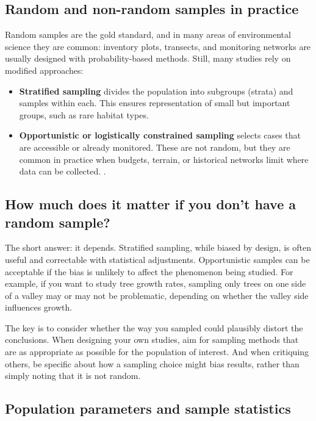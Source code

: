 \documentclass[
  letterpaper,
  DIV=11,
  numbers=noendperiod]{scrreprt}
\providecommand{\tightlist}{%
  \setlength{\itemsep}{0pt}\setlength{\parskip}{0pt}}
\begin{document}
\subsection{Random and non-random samples in
practice}\label{random-and-non-random-samples-in-practice}

Random samples are the gold standard, and in many areas of environmental
science they are common: inventory plots, transects, and monitoring
networks are usually designed with probability-based methods. Still,
many studies rely on modified approaches:

\begin{itemize}
\tightlist
\item
  \textbf{Stratified sampling} divides the population into subgroups
  (strata) and samples within each. This ensures representation of small
  but important groups, such as rare habitat types.
\item
  \textbf{Opportunistic or logistically constrained sampling} selects
  cases that are accessible or already monitored. These are not random,
  but they are common in practice when budgets, terrain, or historical
  networks limit where data can be collected. .
\end{itemize}

\subsection{How much does it matter if you don't have a random
sample?}\label{how-much-does-it-matter-if-you-dont-have-a-random-sample}

The short answer: it depends. Stratified sampling, while biased by
design, is often useful and correctable with statistical adjustments.
Opportunistic samples can be acceptable if the bias is unlikely to
affect the phenomenon being studied. For example, if you want to study
tree growth rates, sampling only trees on one side of a valley may or
may not be problematic, depending on whether the valley side influences
growth.

The key is to consider whether the way you sampled could plausibly
distort the conclusions. When designing your own studies, aim for
sampling methods that are as appropriate as possible for the population
of interest. And when critiquing others, be specific about how a
sampling choice might bias results, rather than simply noting that it is
not random.

\subsection{Population parameters and sample
statistics}\label{population-parameters-and-sample-statistics}
\end{document}
